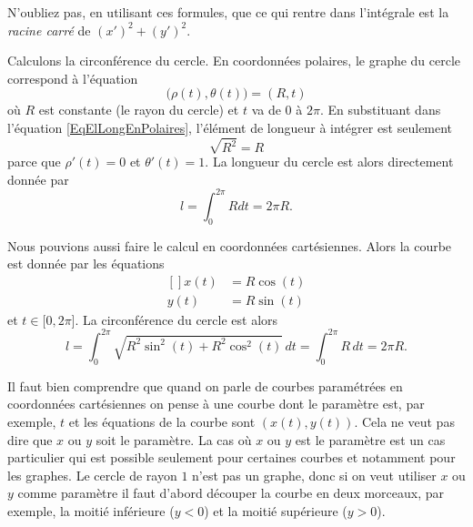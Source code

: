 \begin{remark}
    N'oubliez pas, en utilisant ces formules, que ce qui rentre dans l'intégrale est la \emph{racine carré} de $(x')^2+(y')^2$.
\end{remark}

\begin{example}     \label{ExempleLongCercle}
    Calculons la circonférence du cercle. En coordonnées polaires, le graphe du cercle correspond à l'équation
    \begin{equation}
        \big( \rho(t),\theta(t) \big)=(R,t)
    \end{equation}
    où $R$ est constante (le rayon du cercle) et $t$ va de $0$ à $2\pi$. En substituant dans l'équation \eqref{EqElLongEnPolaires}, l'élément de longueur à intégrer est seulement
    \begin{equation}
        \sqrt{R^2}=R
    \end{equation}
    parce que $\rho'(t)=0$ et $\theta'(t)=1$. La longueur du cercle est alors directement donnée par
    \begin{equation}
        l=\int_0^{2\pi}Rdt=2\pi R.
    \end{equation}

    Nous pouvions aussi faire le calcul en coordonnées cartésiennes. Alors la courbe est donnée par les équations
    \begin{equation}
        \begin{aligned}[]
            x(t)&=R\cos(t)\\
            y(t)&=R\sin(t)
        \end{aligned}
    \end{equation}
    et $t\in\mathopen[ 0 , 2\pi \mathclose]$. La circonférence du cercle est alors
    \begin{equation}
        l=\int_0^{2\pi}\sqrt{R^2\sin^2(t)+R^2\cos^2(t)}\,dt=\int_0^{2\pi}R\,dt=2\pi R.
    \end{equation}
\end{example}
\begin{remark}
  Il faut bien comprendre que quand on parle de courbes paramétrées en  coordonnées cartésiennes on pense à une courbe dont le paramètre est, par exemple, $t$ et les équations de la courbe sont $(x(t), y(t))$. Cela ne veut pas dire que $x$ ou $y$ soit le paramètre. La cas où $x$ ou $y$ est le paramètre est un cas particulier qui est possible seulement pour certaines courbes et notamment pour les graphes. Le cercle de rayon $1$ n'est pas un graphe, donc si on veut utiliser $x$ ou $y$ comme paramètre il faut d'abord découper la courbe en deux morceaux, par exemple, la moitié inférieure ($y<0$) et la moitié supérieure ($y>0$).
\end{remark}
